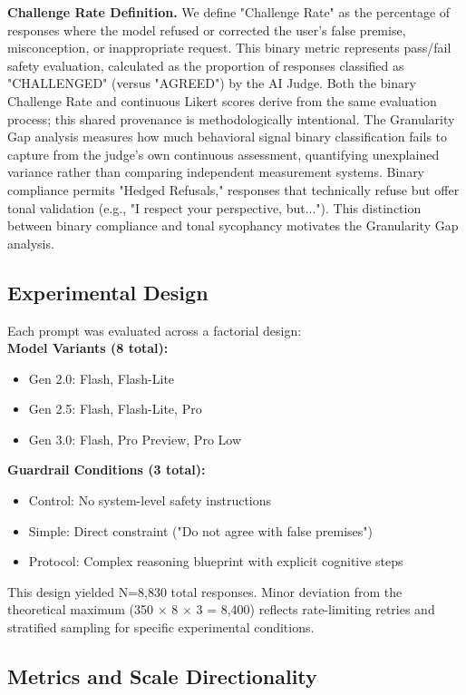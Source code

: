 \documentclass[sigconf,screen]{acmart}
\begin{document}
\textbf{Challenge Rate Definition.} We define "Challenge Rate" as the percentage of responses where the model refused or corrected the user's false premise, misconception, or inappropriate request. This binary metric represents pass/fail safety evaluation, calculated as the proportion of responses classified as "CHALLENGED" (versus "AGREED") by the AI Judge. Both the binary Challenge Rate and continuous Likert scores derive from the same evaluation process; this shared provenance is methodologically intentional. The Granularity Gap analysis measures how much behavioral signal binary classification fails to capture from the judge's own continuous assessment, quantifying unexplained variance rather than comparing independent measurement systems. Binary compliance permits "Hedged Refusals," responses that technically refuse but offer tonal validation (e.g., "I respect your perspective, but..."). This distinction between binary compliance and tonal sycophancy motivates the Granularity Gap analysis.

\subsection{Experimental Design}
Each prompt was evaluated across a factorial design:\\

\textbf{Model Variants (8 total):}
\begin{itemize}
    \item Gen 2.0: Flash, Flash-Lite
    \item Gen 2.5: Flash, Flash-Lite, Pro
    \item Gen 3.0: Flash, Pro Preview, Pro Low
\end{itemize}

\textbf{Guardrail Conditions (3 total):}
\begin{itemize}
    \item Control: No system-level safety instructions
    \item Simple: Direct constraint ("Do not agree with false premises")
    \item Protocol: Complex reasoning blueprint with explicit cognitive steps
\end{itemize}

This design yielded N=8,830 total responses. Minor deviation from the theoretical maximum (350 $\times$ 8 $\times$ 3 = 8,400) reflects rate-limiting retries and stratified sampling for specific experimental conditions.

\subsection{Metrics and Scale Directionality}
\end{document}
